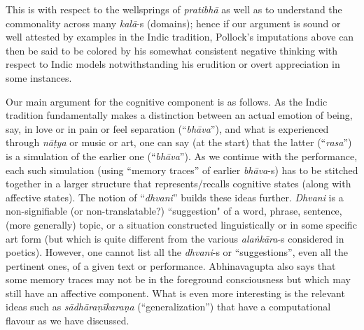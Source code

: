 This is with respect to the wellsprings of \textsl{pratibhā} as well as to understand the commonality across many \textsl{kalā}-s (domains); hence if our argument is sound or well attested by examples in the Indic tradition, Pollock’s imputations above can then be said to be colored by his somewhat consistent negative thinking with respect to Indic models notwithstanding his erudition or overt appreciation in some instances. 


Our main argument for the cognitive component is as follows. As the Indic tradition fundamentally makes a distinction between an actual emotion of being, say, in love or in pain or feel separation (“\textsl{bhāva}”), and what is experienced through \textsl{nāṭya} or music or art, one can say (at the start) that the latter (“\textsl{rasa}”) is a simulation of the earlier one (“\textsl{bhāva}”). As we continue with the performance, each such simulation (using “memory traces” of earlier \textsl{bhāva}-s) has to be stitched together in a larger structure that represents/recalls cognitive states (along with affective states). The notion of “\textsl{dhvani}” builds these ideas further. \textsl{Dhvani} is a non-signifiable (or non-translatable?) ``suggestion" of a word, phrase, sentence, (more generally) topic, or a situation constructed linguistically or in some specific art form (but which is quite different from the various \textsl{alaṅkāra}-s considered in poetics). However, one cannot list all the \textsl{dhvani}-s or “suggestions”, even all the pertinent ones, of a given text or performance. Abhinavagupta also says that some memory traces may not be in the foreground consciousness but which may still have an affective component. What is even more interesting is the relevant ideas such as \textsl{sādhāraṇīkaraṇa} (“generalization”) that have a computational flavour as we have discussed.


